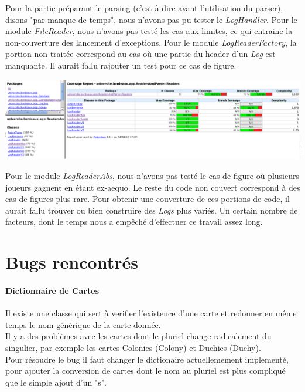 Pour la partie préparant le parsing (c'est-à-dire avant l'utilisation du parser), disons "par manque de temps", nous n'avons pas pu tester le \textit{LogHandler}. Pour le module \textit{FileReader}, nous n'avons pas testé les cas aux limites, ce qui entraine la non-couverture des lancement d'exceptions. Pour le module \textit{LogReaderFactory}, la portion non traitée correspond au cas où une partie du header d'un \textit{Log} est manquante. Il aurait fallu rajouter un test pour ce cas de figure.

\includegraphics[width=\textwidth,height=\textheight,keepaspectratio]{./coverage_ReadersLog}

Pour le module \textit{LogReaderAbs}, nous n'avons pas testé le cas de figure où plusieurs joueurs gagnent en étant ex-aequo. Le reste du code non couvert correspond à des cas de figures plus rare. Pour obtenir une couverture de ces portions de code, il aurait fallu trouver ou bien construire des \textit{Logs} plus variés. Un certain nombre de facteurs, dont le temps nous a empêché d'effectuer ce travail assez long.

\section{Bugs rencontrés}

\paragraph*{Dictionnaire de Cartes} 

Il existe une classe qui sert à verifier l'existence d'une carte et redonner en même temps le nom générique de la carte donnée.\\
Il y a des problèmes avec les cartes dont le pluriel change radicalement du singulier, par exemple les cartes Colonies (Colony) et Duchies (Duchy). \\

Pour résoudre le bug il faut changer le dictionaire actuellemement implementé, pour ajouter la conversion de cartes dont le nom au pluriel est plus compliqué que le simple ajout d'un "s".


